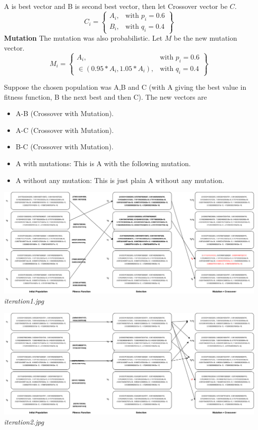 \documentclass[11pt]{article}
\begin{document}
\begin{enumerate}
A is best vector and B is second best vector, then let Crossover vector be $C$.
\[
	C_i = \left.
	\begin{cases}
	  A_i, & \text{with } p_i = 0.6  \\
	  B_i, & \text{with } q_i = 0.4 
	\end{cases}
	\right\}
  \]
\textbf{Mutation}
The mutation was also probabilistic. Let $M$ be the new mutation vector. 
\[
	M_i = \left.
	\begin{cases}
	  A_i, & \text{with } p_i = 0.6  \\
	  \in (0.95*A_i,1.05*A_i), & \text{with } q_i = 0.4 
	\end{cases}
	\right\}
  \]

	Suppose the chosen population was A,B and C (with A giving the best value in fitness function, B the next best and then C).
	 The new vectors are
	\begin{itemize}
		\item	A-B (Crossover with Mutation).
		\item 	A-C (Crossover with Mutation).
		\item 	B-C (Crossover with Mutation).
		\item 	A with mutations: This is A with the following mutation.
		\item 	A without any mutation: This is just plain A without any mutation.
	\end{itemize}
	\end{enumerate}
	\begin{center}
		\includegraphics[width=\linewidth]{iteration1.jpg}
		\\
		\textit{iteration1.jpg}
	  \end{center}
	  \begin{center}
		\includegraphics[width=\linewidth]{iteration2.jpg}
		\\
		\textit{iteration2.jpg}
	  \end{center}
\end{document}
